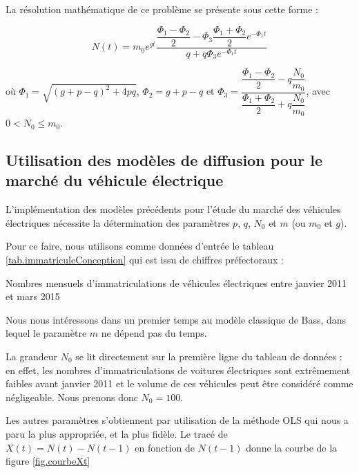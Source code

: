 \documentclass[10pt]{article}
\begin{document}
		
		La résolution mathématique de ce problème se présente sous cette forme :
		
			\[
				N(t) = m_0 e^{gt} \dfrac{\dfrac{\Phi_1 - \Phi_2}{2} - \Phi_3 \dfrac{\Phi_1 + \Phi_2}{2} e^{-\Phi_1 t}}{q + q \Phi_3 e^{-\Phi_1 t}}
			\]
			
		où $\Phi_1 = \sqrt{(g+p-q)^2 + 4pq}$, $\Phi_2 = g + p - q$ et $\Phi_3 = \dfrac{\dfrac{\Phi_1 - \Phi_2}{2} - q \dfrac{N_0}{m_0}}{\dfrac{\Phi_1 + \Phi_2}{2} + q \dfrac{N_0}{m_0}}$, avec $0 < N_0 \leqslant m_0$.


	\subsection{Utilisation des modèles de diffusion pour le marché du véhicule électrique}

		L'implémentation des modèles précédents pour l'étude du marché des véhicules électriques nécessite la détermination des paramètres $p$, $q$, $N_0$ et $m$ (ou $m_0$ et $g$).

		Pour ce faire, nous utilisons comme données d'entrée le tableau \ref{tab.immatriculeConception} qui est issu de chiffres préfectoraux :
	
		\begin{table}[h!]
			\caption{Nombres mensuels d'immatriculations de véhicules électriques entre janvier 2011 et mars 2015 \label{tab.immatriculeConception}}
			\begin{center}
			
			\end{center}
		\end{table}


		Nous nous intéressons dans un premier temps au modèle classique de Bass, dans lequel le paramètre $m$ ne dépend pas du temps.

		La grandeur $N_0$ se lit directement sur la première ligne du tableau de données : en effet, les nombres d'immatriculations de voitures électriques sont extrêmement faibles avant janvier 2011 et le volume de ces véhicules peut être considéré comme négligeable. Nous prenons donc $N_0 = 100$.

		Les autres paramètres s'obtiennent par utilisation de la méthode OLS qui nous a paru la plus appropriée, et la plus fidèle. Le tracé de $X(t) = N(t) - N(t-1)$ en fonction de $N(t-1)$ donne la courbe de la figure \ref{fig.courbeXt}
		
\end{document}
